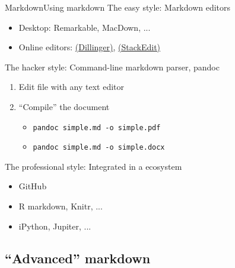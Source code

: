 \documentclass{beamer}
\begin{document}
\begin{frame}{Markdown}{Using markdown}
	The easy style: Markdown editors
		\begin{itemize}
		\item Desktop: Remarkable, MacDown, ...
		\item Online editors: \href{http://dillinger.io}{(Dillinger)}, \href{https://stackedit.io/}{(StackEdit)}
		\end{itemize}
	The hacker style: Command-line markdown parser, \alert{pandoc}
		\begin{enumerate}
		\item Edit file with any text editor
		\item ``Compile'' the document
		\begin{itemize}
		\item \texttt{pandoc simple.md -o simple.pdf}
		\item \texttt{pandoc simple.md -o simple.docx}
		\end{itemize}
		\end{enumerate}
	The professional style: Integrated in a ecosystem 
	\begin{itemize}
		\item GitHub 
		\item R markdown, Knitr, ...
		\item iPython, Jupiter, ...
	\end{itemize}
\end{frame}


\subsection{``Advanced'' markdown}

\end{document}
